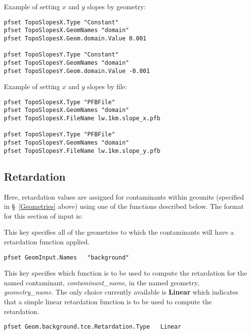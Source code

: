 Example of setting $x$ and $y$ slopes by geometry:
\begin{display}\begin{verbatim}
pfset TopoSlopesX.Type "Constant"
pfset TopoSlopesX.GeomNames "domain"
pfset TopoSlopesX.Geom.domain.Value 0.001

pfset TopoSlopesY.Type "Constant"
pfset TopoSlopesY.GeomNames "domain"
pfset TopoSlopesY.Geom.domain.Value -0.001
\end{verbatim}\end{display}

Example of setting $x$ and $y$ slopes by file:
\begin{display}\begin{verbatim}
pfset TopoSlopesX.Type "PFBFile"
pfset TopoSlopesX.GeomNames "domain"
pfset TopoSlopesX.FileName lw.1km.slope_x.pfb

pfset TopoSlopesY.Type "PFBFile"
pfset TopoSlopesY.GeomNames "domain"
pfset TopoSlopesY.FileName lw.1km.slope_y.pfb
\end{verbatim}\end{display}


\subsection{Retardation}
\label{Retardation}

Here, retardation values are assigned for contaminants within
geounits (specified in \S~\ref{Geometries} above) using one of
the functions described below.  The format for this section of
input is:

{
This key specifies all of the geometries to which the contaminants will
have a retardation function applied.
}
\begin{display}\begin{verbatim}
pfset GeomInput.Names   "background"
\end{verbatim}\end{display}

{
This key specifies which function is to be used to compute the
retardation for the named contaminant, {\em contaminant\_name}, in the
named geometry, {\em geometry\_name}.  The only choice currently
available is {\bf Linear} which indicates that a simple linear
retardation function is to be used to compute the retardation.
}
\begin{display}\begin{verbatim}
pfset Geom.background.tce.Retardation.Type   Linear
\end{verbatim}\end{display}

